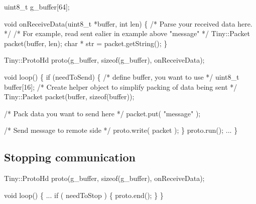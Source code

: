 \begin{DoxyCode}
uint8\_t g\_buffer[64];

\textcolor{keywordtype}{void} onReceiveData(uint8\_t *buffer, \textcolor{keywordtype}{int} len)
\{
    \textcolor{comment}{/* Parse your received data here. */}
    \textcolor{comment}{/* For example, read sent ealier in example above "message" */}
    Tiny::Packet packet(buffer, len);
    \textcolor{keywordtype}{char} * str = packet.getString();
\}

Tiny::ProtoHd proto(g\_buffer, \textcolor{keyword}{sizeof}(g\_buffer), onReceiveData);

\textcolor{keywordtype}{void} loop()
\{
    \textcolor{keywordflow}{if} (needToSend)
    \{
        \textcolor{comment}{/* define buffer, you want to use */}
        uint8\_t buffer[16];
        \textcolor{comment}{/* Create helper object to simplify packing of data being sent */}
        Tiny::Packet packet(buffer, \textcolor{keyword}{sizeof}(buffer));

        \textcolor{comment}{/* Pack data you want to send here */}
        packet.put( \textcolor{stringliteral}{"message"} );

        \textcolor{comment}{/* Send message to remote side */}
        proto.write( packet );
    \}
    proto.run();
    ...
\}
\end{DoxyCode}
\hypertarget{arduino_arduino_tiny_hd_close}{}\subsection{Stopping communication}\label{arduino_arduino_tiny_hd_close}

\begin{DoxyCode}
Tiny::ProtoHd proto(g\_buffer, \textcolor{keyword}{sizeof}(g\_buffer), onReceiveData);

\textcolor{keywordtype}{void} loop()
\{
    ...
    \textcolor{keywordflow}{if} ( needToStop )
    \{
        proto.end();
    \}
\}
\end{DoxyCode}
 